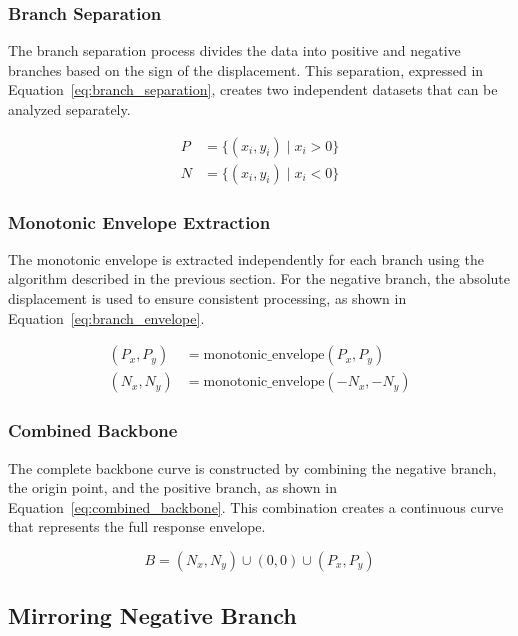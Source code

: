 \documentclass[11pt,a4paper]{article}
\begin{document}
\subsubsection{Branch Separation}

The branch separation process divides the data into positive and negative branches based on the sign of the displacement. This separation, expressed in Equation~\ref{eq:branch_separation}, creates two independent datasets that can be analyzed separately.

\begin{align}
P &= \{(x_i, y_i) \mid x_i > 0\} \\
N &= \{(x_i, y_i) \mid x_i < 0\}
\label{eq:branch_separation}
\end{align}

\subsubsection{Monotonic Envelope Extraction}

The monotonic envelope is extracted independently for each branch using the algorithm described in the previous section. For the negative branch, the absolute displacement is used to ensure consistent processing, as shown in Equation~\ref{eq:branch_envelope}.

\begin{align}
(P_x, P_y) &= \text{monotonic\_envelope}(P_x, P_y) \\
(N_x, N_y) &= \text{monotonic\_envelope}(-N_x, -N_y)
\label{eq:branch_envelope}
\end{align}

\subsubsection{Combined Backbone}

The complete backbone curve is constructed by combining the negative branch, the origin point, and the positive branch, as shown in Equation~\ref{eq:combined_backbone}. This combination creates a continuous curve that represents the full response envelope.

\begin{equation}
B = (N_x, N_y) \cup (0, 0) \cup (P_x, P_y)
\label{eq:combined_backbone}
\end{equation}

\subsection{Mirroring Negative Branch}
\end{document}
